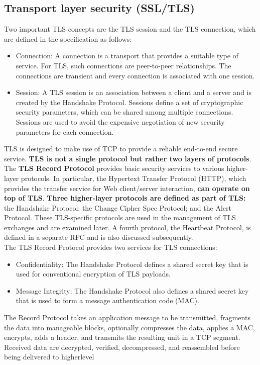 \documentclass[12pt]{article}
\begin{document}
 \subsection{Transport layer security (SSL/TLS)}
 Two important TLS concepts are the TLS session and the TLS connection, which are defined in the specification as follows:
 \begin{itemize}
 	\item Connection: A connection is a transport that provides a suitable type of service. For TLS, such connections are peer-to-peer relationships. The connections are transient and every connection is associated with one session.
 	\item Session: A TLS session is an association between a client and a server and is created by the Handshake Protocol. Sessions define a set of cryptographic security parameters, which can be shared among multiple connections. Sessions are used to avoid the expensive negotiation of new security parameters for each connection.
 \end{itemize}
 TLS is designed to make use of TCP to provide a reliable end-to-end secure service. \textbf{TLS is not a single protocol but rather two layers of protocols}. The \textbf{TLS Record Protocol} provides basic security services to various higher-layer protocols. In particular, the Hypertext Transfer Protocol (HTTP), which provides the transfer service for Web client/server interaction,\textbf{ can operate on top of TLS}. \textbf{Three higher-layer protocols are defined as part of TLS:} the Handshake Protocol; the Change Cipher Spec Protocol; and the Alert Protocol. These TLS-specific protocols are used in the management of TLS exchanges and are examined later. A fourth protocol, the Heartbeat Protocol, is defined in a separate RFC and is also discussed subsequently.\\
 The TLS Record Protocol provides two services for TLS connections:
 \begin{itemize}
 	\item Confidentiality: The Handshake Protocol defines a shared secret key that is used for conventional encryption of TLS payloads.
 	\item Message Integrity: The Handshake Protocol also defines a shared secret key that is used to form a message authentication code (MAC).
 \end{itemize}
 The Record Protocol takes an application message to be transmitted, fragments the data into manageable blocks, optionally compresses the data, applies a MAC, encrypts, adds a header, and transmits the resulting unit in a TCP segment. Received data are decrypted, verified, decompressed, and reassembled before being delivered to higherlevel
\end{document}
